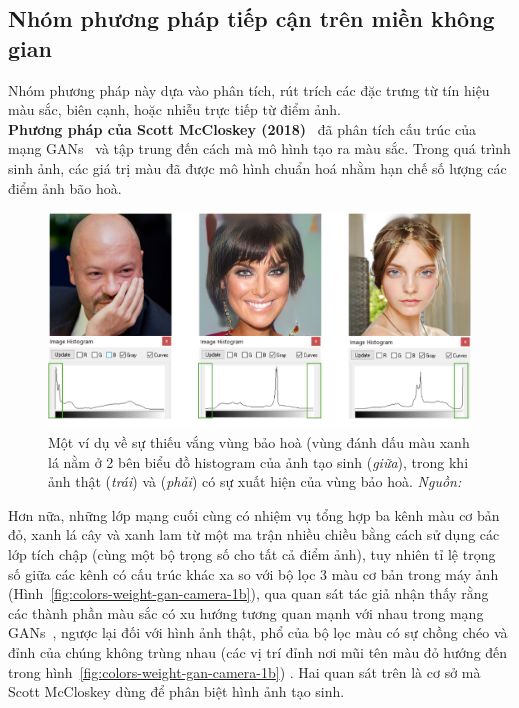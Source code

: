 \subsection{Nhóm phương pháp tiếp cận trên miền không gian}
Nhóm phương pháp này dựa vào phân tích, rút trích các đặc trưng từ tín hiệu màu sắc, biên cạnh, hoặc nhiễu trực tiếp từ điểm ảnh.\\
\textbf{Phương pháp của Scott McCloskey (2018)}~\cite{8803661} đã phân tích cấu trúc của mạng GANs~\cite{Goodfellow2014GenerativeAN} và tập trung đến cách mà mô hình tạo ra màu sắc. Trong quá trình sinh ảnh, các giá trị màu đã được mô hình chuẩn hoá nhằm hạn chế số lượng các điểm ảnh bão hoà\footnotemark{}.
%
\begin{figure}[htp]
	\centering
	\includegraphics[width=0.9\linewidth]{Images/histograms-gan-real-1.png}
	\caption{
		Một ví dụ về sự thiếu vắng vùng bảo hoà (vùng đánh dấu màu xanh lá nằm ở 2 bên biểu đồ \gls{histogram} của ảnh tạo sinh (\textit{giữa}), trong khi ảnh thật (\textit{trái}) và (\textit{phải}) có sự xuất hiện của vùng bảo hoà. \textit{Nguồn: \cite{8803661}}
		}
	\label{fig:histograms-gan-real-1}
\end{figure}
%
Hơn nữa, những lớp mạng cuối cùng có nhiệm vụ tổng hợp ba kênh màu cơ bản đỏ, xanh lá cây và xanh lam từ một ma trận nhiều chiều bằng cách sử dụng các lớp tích chập (cùng một bộ trọng số cho tất cả điểm ảnh), tuy nhiên tỉ lệ trọng số giữa các kênh có cấu trúc khác xa so với bộ lọc 3 màu cơ bản trong máy ảnh (Hình~\ref{fig:colors-weight-gan-camera-1b}), qua quan sát tác giả nhận thấy rằng các thành phần màu sắc có xu hướng tương quan mạnh với nhau trong mạng GANs~\cite{Goodfellow2014GenerativeAN}, ngược lại đối với hình ảnh thật, phổ của bộ lọc màu có sự chồng chéo và đỉnh của chúng không trùng nhau (các vị trí đỉnh nơi mũi tên màu đỏ hướng đến trong hình~\ref{fig:colors-weight-gan-camera-1b}) . Hai quan sát trên là cơ sở mà Scott McCloskey dùng để phân biệt hình ảnh tạo sinh.

